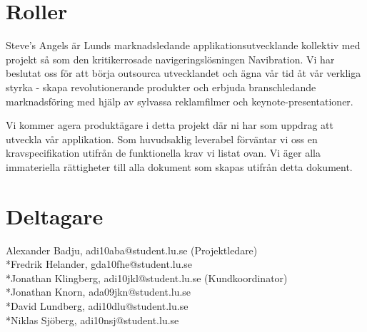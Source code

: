 \documentclass[10pt]{article}
\begin{document}
\section*{Roller}
\sloppy
\noindent Steve's Angels är Lunds marknadsledande applikationsutvecklande kollektiv med projekt så som den kritikerrosade navigeringslösningen Navibration. Vi har beslutat oss för att börja outsourca utvecklandet och ägna vår tid åt vår verkliga styrka - skapa revolutionerande produkter och erbjuda branschledande marknadsföring med hjälp av sylvassa reklamfilmer och keynote-presentationer.

Vi kommer agera produktägare i detta projekt där ni har som uppdrag att utveckla vår applikation. Som huvudsaklig leverabel förväntar vi oss en kravspecifikation utifrån de funktionella krav vi listat ovan. Vi äger alla immateriella rättigheter till alla dokument som skapas utifrån detta dokument.

\section*{Deltagare}
\noindent Alexander Badju, adi10aba@student.lu.se (Projektledare)	
\\*Fredrik Helander, gda10fhe@student.lu.se 
\\*Jonathan Klingberg, adi10jkl@student.lu.se (Kundkoordinator)
\\*Jonathan Knorn, ada09jkn@student.lu.se 
\\*David Lundberg, adi10dlu@student.lu.se 
\\*Niklas Sjöberg, adi10nsj@student.lu.se
\end{document}
